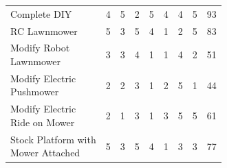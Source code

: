 \documentclass[12pt]{extarticle}
\begin{document}
\begin{table}[H]
\begin{adjustwidth}{-1.5in}{-1.5in}
\begin{tabular}{lcccccccc}
		\\[-2ex]
		\multicolumn{1}{l}{\cellcolor{highlight}Complete DIY}& \multicolumn{1}{c}{\cellcolor{highlight}4} & \multicolumn{1}{c}{\cellcolor{highlight}5} & \multicolumn{1}{c}{\cellcolor{highlight}2} & \multicolumn{1}{c}{\cellcolor{highlight}5} & \multicolumn{1}{c}{\cellcolor{highlight}4} & \multicolumn{1}{c}{\cellcolor{highlight}4} & \multicolumn{1}{c}{\cellcolor{highlight}5} & \multicolumn{1}{c}{\cellcolor{highlight}93}    \\ \hdashline
		RC Lawnmower                                           & 5                   & 3              & 5                    & 4                              & 1    & 2        & 5        & 83    \\ \hdashline
		\makecell[l]{Modify Robot \\ Lawnmower}                & 3                   & 3              & 4                    & 1                              & 1    & 4        & 2        & 51    \\ \hdashline
		\makecell[l]{Modify Electric \\ Pushmower}             & 2                   & 2              & 3                    & 1                              & 2    & 5        & 1        & 44    \\ \hdashline
		\makecell[l]{Modify Electric \\ Ride on Mower}         & 2                   & 1              & 3                    & 1                              & 3    & 5        & 5        & 61    \\ \hdashline
		\makecell[l]{Stock Platform with \\ Mower Attached}    & 5                   & 3              & 5                    & 4                              & 1    & 3        & 3        & 77    \\ 
		\end{tabular}
		
		\end{adjustwidth}
		\end{table}
		
\end{document}
